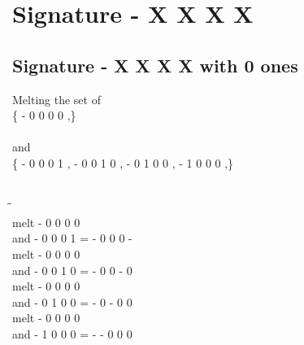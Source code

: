 \documentclass{article}
\begin{document}
\section{Signature - X X X X }
\subsection{Signature - X X X X with 0 ones}
Melting the set of\\
\{ -  0  0  0  0 ,\}\\\\
and\\
\{ -  0  0  0  1 , -  0  0  1  0 , -  0  1  0  0 , -  1  0  0  0 ,\}\\\\
\begin{tabbing}
\hspace{3cm}\=\hspace{3cm}\=\hspace{3cm}\\[1cm]
melt\> -  0  0  0  0 \\
and\> -  0  0  0  1 \>
 =  -  0  0  0  - \\[1mm]
melt\> -  0  0  0  0 \\
and\> -  0  0  1  0 \>
 =  -  0  0  -  0 \\[1mm]
melt\> -  0  0  0  0 \\
and\> -  0  1  0  0 \>
 =  -  0  -  0  0 \\[1mm]
melt\> -  0  0  0  0 \\
and\> -  1  0  0  0 \>
 =  -  -  0  0  0 \\[1mm]
\end{tabbing}
\newpage
\end{document}
